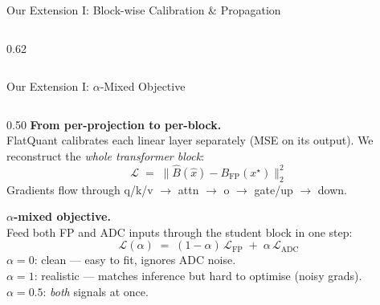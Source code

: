 \begin{frame}[shrink=10]{Our Extension I: Block-wise Calibration \& Propagation}
\begin{columns}[T]
\begin{column}{0.62\textwidth}
\begin{center}
{}
      \end{center}
    \end{column}
  \end{columns}
\end{frame}

\begin{frame}[shrink=10]{Our Extension I: $\alpha$-Mixed Objective}

  \begin{columns}[T]
    \begin{column}{0.50\textwidth}
      \footnotesize
      \textbf{From per-projection to per-block.}\\[0.2em]
      FlatQuant calibrates each linear layer separately (MSE on its output). We reconstruct the \emph{whole transformer block}:
      \[
        \mathcal L \;=\; \bigl\| \hat B\!\left(\hat x\right) - B_{\mathrm{FP}}(x^\star) \bigr\|_2^2
      \]
      Gradients flow through q/k/v $\to$ attn $\to$ o $\to$ gate/up $\to$ down.

      \vspace{0.5em}
      \textbf{$\alpha$-mixed objective.}\\[0.2em]
      Feed both FP and ADC inputs through the student block in one step:
      \[
        \mathcal L(\alpha) \;=\; (1{-}\alpha)\,\mathcal L_{\mathrm{FP}} \;+\; \alpha\,\mathcal L_{\mathrm{ADC}}
      \]
      \scriptsize
      $\alpha{=}0$: clean — easy to fit, ignores ADC noise.\\
      $\alpha{=}1$: realistic — matches inference but hard to optimise (noisy grads).\\
      $\alpha{=}0.5$: \emph{both} signals at once.
    \end{column}


\end{columns}
\end{frame}

